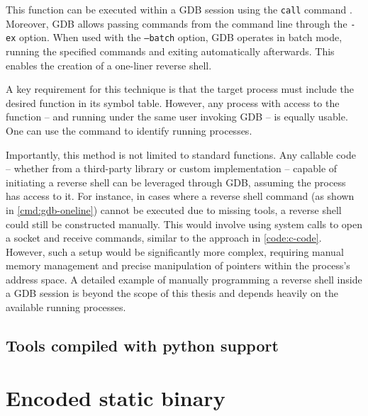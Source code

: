 This function can be executed within a GDB session using the \texttt{call} command \cite{gdb-man}. Moreover, GDB allows passing commands from the command line through the \texttt{-ex} option. When used with the \texttt{--batch} option, GDB operates in batch mode, running the specified commands and exiting automatically afterwards. This enables the creation of a one-liner reverse shell.


A key requirement for this technique is that the target process must include the desired function in its symbol table. However, any process with access to the function -- and running under the same user invoking GDB -- is equally usable. One can use the  command to identify running processes.

Importantly, this method is not limited to standard functions. Any callable code -- whether from a third-party library or custom implementation -- capable of initiating a reverse shell can be leveraged through GDB, assuming the process has access to it. For instance, in cases where a reverse shell command (as shown in \cref{cmd:gdb-oneline}) cannot be executed due to missing tools, a reverse shell could still be constructed manually. This would involve using system calls to open a socket and receive commands, similar to the approach in \cref{code:c-code}. However, such a setup would be significantly more complex, requiring manual memory management and precise manipulation of pointers within the process's address space. A detailed example of manually programming a reverse shell inside a GDB session is beyond the scope of this thesis and depends heavily on the available running processes.


\subsection{Tools compiled with python support}
\label{sec:compiled-with-python}



\section{Encoded static binary}


